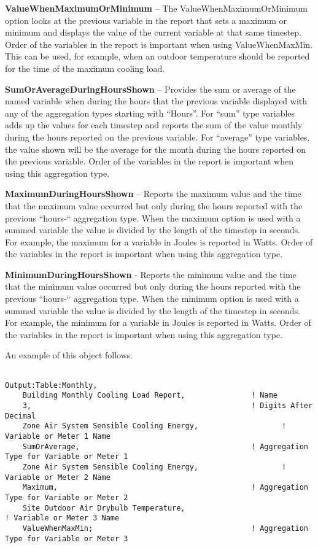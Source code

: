 \textbf{ValueWhenMaximumOrMinimum} -- The ValueWhenMaximumOrMinimum option looks at the previous variable in the report that sets a maximum or minimum and displays the value of the current variable at that same timestep. Order of the variables in the report is important when using ValueWhenMaxMin. This can be used, for example, when an outdoor temperature should be reported for the time of the maximum cooling load.

\textbf{SumOrAverageDuringHoursShown} -- Provides the sum or average of the named variable when during the hours that the previous variable displayed with any of the aggregation types starting with ``Hours''. For ``sum'' type variables adds up the values for each timestep and reports the sum of the value monthly during the hours reported on the previous variable. For ``average'' type variables, the value shown will be the average for the month during the hours reported on the previous variable. Order of the variables in the report is important when using this aggregation type.

\textbf{MaximumDuringHoursShown} -- Reports the maximum value and the time that the maximum value occurred but only during the hours reported with the previous ``hours-`` aggregation type. When the maximum option is used with a summed variable the value is divided by the length of the timestep in seconds. For example, the maximum for a variable in Joules is reported in Watts. Order of the variables in the report is important when using this aggregation type.

\textbf{MinimumDuringHoursShown} - Reports the minimum value and the time that the minimum value occurred but only during the hours reported with the previous ``hours-`` aggregation type. When the minimum option is used with a summed variable the value is divided by the length of the timestep in seconds. For example, the minimum for a variable in Joules is reported in Watts. Order of the variables in the report is important when using this aggregation type.

An example of this object follows.

\begin{lstlisting}

Output:Table:Monthly,
    Building Monthly Cooling Load Report,               ! Name
    3,                                                  ! Digits After Decimal
    Zone Air System Sensible Cooling Energy,                   ! Variable or Meter 1 Name
    SumOrAverage,                                       ! Aggregation Type for Variable or Meter 1
    Zone Air System Sensible Cooling Energy,                   ! Variable or Meter 2 Name
    Maximum,                                            ! Aggregation Type for Variable or Meter 2
    Site Outdoor Air Drybulb Temperature,                                   ! Variable or Meter 3 Name
    ValueWhenMaxMin;                                    ! Aggregation Type for Variable or Meter 3
\end{lstlisting}
